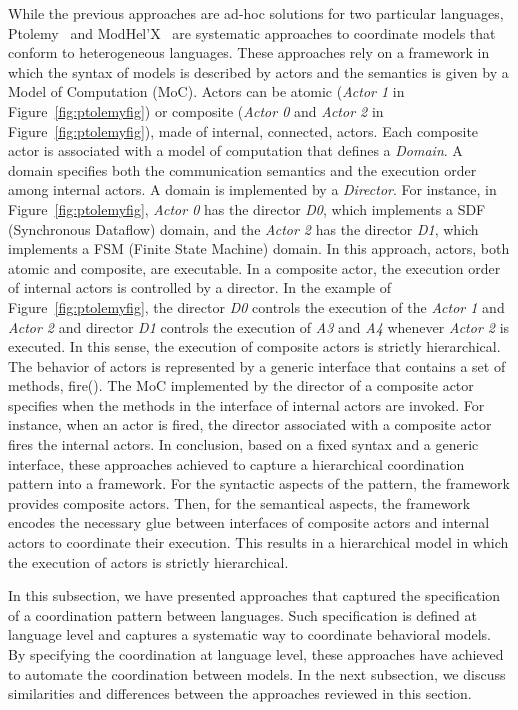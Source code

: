 While the previous approaches are ad-hoc solutions for two particular languages, Ptolemy~\cite{ptoleframebib} and ModHel'X~\cite{modhelxbib} are systematic approaches to coordinate models that conform to heterogeneous languages. These approaches rely on a framework in which the syntax of models is described by actors and the semantics is given by a Model of Computation (MoC). Actors can be atomic (\eg \emph{Actor 1} in Figure~\ref{fig:ptolemyfig}) or composite (\eg \emph{Actor 0} and \emph{Actor 2} in Figure~\ref{fig:ptolemyfig}), \ie made of internal, connected, actors. Each composite actor is associated with a model of computation that defines a \emph{Domain}. A domain specifies both the communication semantics and the execution order among internal actors. A domain is implemented by a \emph{Director}. For instance, in Figure~\ref{fig:ptolemyfig}, \emph{Actor 0} has the director \emph{D0}, which implements a SDF (Synchronous Dataflow) domain, and the \emph{Actor 2} has the director \emph{D1}, which implements a FSM (Finite State Machine) domain. In this approach, actors, both atomic and composite, are executable. In a composite actor, the execution order of internal actors is controlled by a director. In the example of Figure~\ref{fig:ptolemyfig}, the director \emph{D0} controls the execution of the \emph{Actor 1} and \emph{Actor 2} and director \emph{D1} controls the execution of \emph{A3} and \emph{A4} whenever \emph{Actor 2} is executed. In this sense, the execution of composite actors is strictly hierarchical. The behavior of actors is represented by a generic interface that contains a set of methods, \eg fire(). The MoC implemented by the director of a composite actor specifies when the methods in the interface of internal actors are invoked. For instance, when an actor is fired, the director associated with a composite actor fires the internal actors. In conclusion, based on a fixed syntax and a generic interface, these approaches achieved to capture a hierarchical coordination pattern into a framework. For the syntactic aspects of the pattern, the framework provides composite actors. Then, for the semantical aspects, the framework encodes the necessary glue between interfaces of composite actors and internal actors to coordinate their execution. This results in a hierarchical model in which the execution of actors is strictly hierarchical.

In this subsection, we have presented approaches that captured the specification of a coordination pattern between languages. Such specification is defined at language level and captures a systematic way to coordinate behavioral models. By specifying the coordination at language level, these approaches have achieved to automate the coordination between models. In the next subsection, we discuss similarities and differences between the approaches reviewed in this section.   

